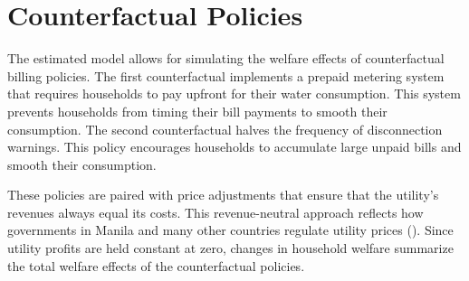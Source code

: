 \documentclass[12pt,table]{article}
\begin{document}





\section{Counterfactual Policies}\label{section:counterfactuals}

The estimated model allows for simulating the welfare effects of counterfactual billing policies.  The first counterfactual implements a prepaid metering system that requires households to pay upfront for their water consumption.  This system prevents households from timing their bill payments to smooth their consumption.  The second counterfactual halves the frequency of disconnection warnings.  This policy encourages households to accumulate large unpaid bills and smooth their consumption. 

These policies are paired with price adjustments that ensure that the utility's revenues always equal its costs.  This revenue-neutral approach reflects how governments in Manila and many other countries regulate utility prices (\cite{hoque2013state}).  Since utility profits are held constant at zero, changes in household welfare summarize the total welfare effects of the counterfactual policies.  
\end{document}
